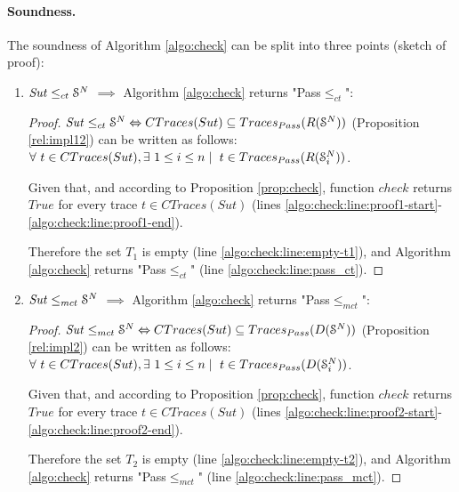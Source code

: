 \paragraph{Soundness.} The soundness of Algorithm
\ref{algo:check} can be split into three points (sketch of proof):

\begin{enumerate}
    \item $\mathit{Sut} \leq_{ct} \EuScript{S}^N$ $\implies$
        Algorithm \ref{algo:check} returns "Pass$\leq_{ct}$":

        \begin{proof}
            $\mathit{Sut} \leq_{ct} \EuScript{S}^{N}
            \Leftrightarrow CTraces(Sut) \subseteq Traces_{Pass}(R(\EuScript{S}^N))$
            (Proposition \ref{rel:impl12}) can be written as
            follows: $\forall ~t \in CTraces(Sut), \exists ~1
            \leq i \leq n \mid ~t \in Traces_{Pass}(R(\EuScript{S}_i^{N}))$.

            Given that, and according to Proposition
            \ref{prop:check}, function $check$ returns $True$ for
            every trace $t \in CTraces(Sut)$ (lines
            \ref{algo:check:line:proof1-start}-\ref{algo:check:line:proof1-end}).

            Therefore the set $T_1$ is empty (line
            \ref{algo:check:line:empty-t1}), and Algorithm
            \ref{algo:check} returns "Pass$\leq_{ct}$" (line
            \ref{algo:check:line:pass_ct}).
        \end{proof}

    \item $\mathit{Sut} \leq_{mct} \EuScript{S}^N$ $\implies$
        Algorithm \ref{algo:check} returns "Pass$\leq_{mct}$":

        \begin{proof}
            $\mathit{Sut} \leq_{mct} \EuScript{S}^{N}
            \Leftrightarrow CTraces(Sut) \subseteq Traces_{Pass}(D(\EuScript{S}^N))$
            (Proposition \ref{rel:impl2}) can be written as
            follows: $\forall ~t \in CTraces(Sut), \exists ~1
            \leq i \leq n \mid ~t \in Traces_{Pass}(D(\EuScript{S}_i^{N}))$.

            Given that, and according to Proposition
            \ref{prop:check}, function $check$ returns $True$ for
            every trace $t \in CTraces(Sut)$ (lines
            \ref{algo:check:line:proof2-start}-\ref{algo:check:line:proof2-end}).

            Therefore the set $T_2$ is empty
            (line \ref{algo:check:line:empty-t2}), and Algorithm
            \ref{algo:check} returns "Pass$\leq_{mct}$" (line
            \ref{algo:check:line:pass_mct}).
        \end{proof}


\end{enumerate}
